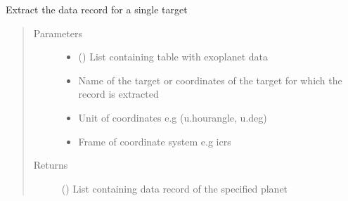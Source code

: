 \documentclass[a4paper,11pt,english]{sphinxmanual}
\begin{document}

\begin{fulllineitems}
\label{\detokenize{cascade.exoplanet_tools:cascade.exoplanet_tools.exoplanet_tools.extract_exoplanet_data}}
Extract the data record for a single target
\begin{quote}\begin{description}
\item[{Parameters}] \leavevmode\begin{itemize}
\item {} 
 () \textendash{} List containing table with exoplanet data

\item {} 
 \textendash{} Name of the target or coordinates of the target for
which the record is extracted

\item {} 
 \textendash{} Unit of coordinates e.g (u.hourangle, u.deg)

\item {} 
 \textendash{} Frame of coordinate system e.g icrs

\end{itemize}

\item[{Returns}] \leavevmode
{} () \textendash{} List containing data record of the specified planet

\end{description}\end{quote}

\end{fulllineitems}

\end{document}
